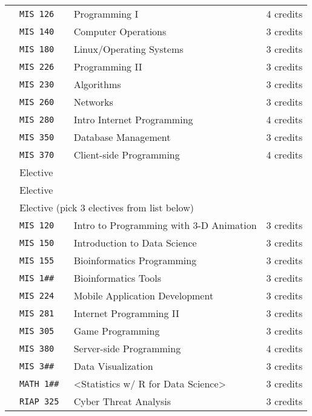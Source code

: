 \documentclass[letterpaper,10pt]{article}
\newcounter{cseNum}
\newcommand\csenumber{\stepcounter{cseNum}\arabic{cseNum}}
\begin{document}
\begin{tabular}{l l l l }
  \csenumber & \texttt{MIS 126} & Programming I & 4 credits \\
  \csenumber & \texttt{MIS 140} & Computer Operations  & 3 credits \\
  \csenumber & \texttt{MIS 180} & Linux/Operating Systems  & 3 credits \\
  \csenumber & \texttt{MIS 226} & Programming II  & 3 credits \\
  \csenumber & \texttt{MIS 230} & Algorithms & 3 credits \\
  \csenumber & \texttt{MIS 260} & Networks & 3 credits \\
  \csenumber & \texttt{MIS 280} & Intro Internet Programming  & 4 credits \\
  \csenumber & \texttt{MIS 350} & Database Management & 3 credits \\
  \csenumber & \texttt{MIS 370} & Client-side Programming & 4 credits \\
  \csenumber & \multicolumn{2}{l}{ Elective } &  \\
  \csenumber &  \multicolumn{2}{l}{ Elective } &  \\
  \csenumber & \multicolumn{3}{l}{Elective \hspace{2em} (pick 3 electives from list below)}\\  
     & \texttt{MIS 120} & Intro to Programming with 3-D Animation &  3 credits \\
     & \texttt{MIS 150} & Introduction to Data Science &  3 credits \\
     & \texttt{MIS 155} & Bioinformatics Programming &  3 credits \\
     & \texttt{MIS 1\#\#} & Bioinformatics Tools  &  3 credits \\
     & \texttt{MIS 224} & Mobile Application Development &  3 credits \\
     & \texttt{MIS 281} & Internet Programming II &  3 credits \\
     & \texttt{MIS 305} & Game Programming &  3 credits \\
     & \texttt{MIS 380} & Server-side Programming &  4 credits \\
     & \texttt{MIS 3\#\#} & Data Visualization &  3 credits \\
     & \texttt{MATH 1\#\#} & <Statistics w/ R for Data Science> &  3 credits \\
     & \texttt{RIAP 325 } & Cyber Threat Analysis &  3 credits \\
\end{tabular}
\end{document}
